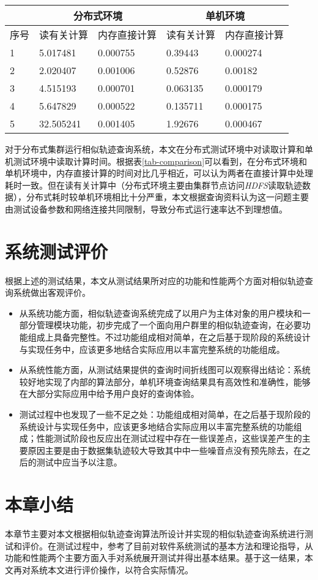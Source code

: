 \begin{table}[h]
  	\centering
		\begin{tabular}{ |p{1cm}<{\centering}|p{3cm}<{\centering}|p{3cm}<{\centering}|p{3cm}<{\centering}|p{3cm}<{\centering}| }
		\hline
		 & \multicolumn{2}{|c|}{分布式环境} & \multicolumn{2}{|c|}{单机环境} \\
		\hline
		序号 & 读有关计算 & 内存直接计算 & 读有关计算 & 内存直接计算 \\
		\hline 
		1 & 5.017481 & 0.000755 & 0.39443 & 0.000274 \\
		\hline
		2 & 2.020407 & 0.001006 & 0.52876 & 0.00182 \\
		\hline
		3 & 4.515193 & 0.000701 & 0.063135 & 0.000179 \\
		\hline
		4 & 5.647829 & 0.000522 & 0.135711 & 0.000175 \\
		\hline
		5 & 32.505241 & 0.001405 & 1.92676 & 0.000467 \\
		\hline
		\end{tabular}
	\end{table}

对于分布式集群运行相似轨迹查询系统，本文在分布式测试环境中对读取计算和单机测试环境中读取计算时间。根据表\ref{tab-comparison}可以看到，在分布式环境和单机环境中，内存直接计算的时间对比几乎相近，可以认为两者在直接计算中处理耗时一致。但在读有关计算中（分布式环境主要由集群节点访问\emph{HDFS}读取轨迹数据），分布式耗时较单机环境相比十分严重，本文根据查询资料认为这一问题主要由测试设备参数和网络连接共同限制，导致分布式运行速率达不到理想值。


\section{系统测试评价}
\label{sec:system evaluation}
根据上述的测试结果，本文从测试结果所对应的功能和性能两个方面对相似轨迹查询系统做出客观评价。
\begin{itemize}
	\item 从系统功能方面，相似轨迹查询系统完成了以用户为主体对象的用户模块和一部分管理模块功能，初步完成了一个面向用户群里的相似轨迹查询，在必要功能组成上具备完整性。不过功能组成相对简单，在之后基于现阶段的系统设计与实现任务中，应该更多地结合实际应用以丰富完整系统的功能组成。
	\item 从系统性能方面，从测试结果提供的查询时间折线图可以观察得出结论：系统较好地实现了内部的算法部分，单机环境查询结果具有高效性和准确性，能够在大部分实际应用中给予用户良好的查询体验。
	\item 测试过程中也发现了一些不足之处：功能组成相对简单，在之后基于现阶段的系统设计与实现任务中，应该更多地结合实际应用以丰富完整系统的功能组成；性能测试阶段也反应出在测试过程中存在一些误差点，这些误差产生的主要原因主要是由于数据集轨迹较大导致其中中一些噪音点没有预先除去，在之后的测试中应当予以注意。
\end{itemize}

\section{本章小结}
\label{sec:evaluation conclusion}
本章节主要对本文根据相似轨迹查询算法所设计并实现的相似轨迹查询系统进行测试和评价。在测试过程中，参考了目前对软件系统测试的基本方法和理论指导，从功能和性能两个主要方面入手对系统展开测试并得出基本结果。基于这一结果，本文再对系统本文进行评价操作，以符合实际情况。

